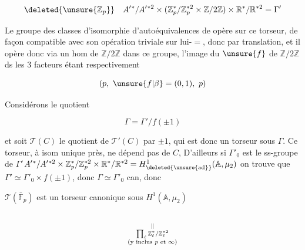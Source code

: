 \[
\deleted{\unsure{\mathbb Z_p}}\quad A'{}^*/A'{}^{*2}\times
(\mathbb Z_p^*/\mathbb Z_p^{*2}\times\mathbb Z/2\mathbb Z)
\times\mathbb R^*/\mathbb R^{*2}=\Gamma'
\]

Le groupe  des classes d'isomorphie d'autoéquivalences de
 opère sur ce torseur, de façon compatible avec
son opération triviale sur lui-$=$, donc par translation,
et il opère donc via un hom  de $\mathbb Z/2\mathbb Z$ dans ce groupe,
 l'image du  $\unsure{f}$ de $\mathbb Z/2\mathbb Z$ ds les 3 facteurs
étant respectivement

\[
(p,\ \unsure{f|\beta}=(0,1),\ p)
\]


Considérons le quotient

\[
\Gamma=\Gamma'/f(\pm1)
\]

et soit $\mathcal T(C)$ le quotient de $\mathcal T'(C)$ par $\pm1$, qui
est donc un torseur sous $\Gamma$. Ce torseur, à isom unique
près, ne dépend pas de $C$,  D'ailleurs si $\Gamma'_0$ est le
ss-groupe de $\Gamma'$\quad $A'{}^*/A'{}^{*2}\times\mathbb Z_p^*/\mathbb Z_p^{*2}\times\mathbb R^*/\mathbb R^{*2}
=H^1_{\deleted{\unsure{\mathrm{ad}}}}(\mathbb A,\mu_2)$ 
on trouve que $\Gamma'\simeq\Gamma'_0\times f(\pm1)$, donc $\Gamma\simeq\Gamma'_0$ can, donc


$\mathcal T(\bar{\mathbb F}_p)$ est un torseur canonique sous $H^1(\mathbb A,\mu_2)$

\[
\underset{\substack{\Vert\\\prod_\ell\mathbb Z_\ell^*/\mathbb Z_\ell^{*2}\\
\text{(y inclus $p$ et $\infty$)}}}{\vphantom{H^1(\mathbb A,\mu_2)}}
\]

